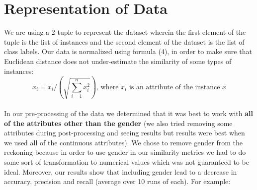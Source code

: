 \section{Representation of Data}

We are using a 2-tuple to represent the dataset wherein the first element of the tuple is the list of instances and the second element of the dataset is the list of class labels. Our data is normalized using formula (4), in order to make sure that Euclidean distance does not under-estimate the similarity of some types of instances:
\\
\begin{equation}
x_i = x_i/(\sqrt{\sum_{i=1}^{n} x_i^2}) \text{, where } x_i \text{ is an attribute of the instance } x
\end{equation}
\\
In our pre-processing of the data we determined that it was best to work with {\bf all of the attributes other than the gender} (we also tried removing some attributes during post-processing and seeing results but results were best when we used all of the continuous attributes). We chose to remove gender from the reckoning because in order to use gender in our similarity metrics we had to do some sort of transformation to numerical values which was not guaranteed to be ideal. Moreover, our results show that including gender lead to a decrease in accuracy, precision and recall (average over 10 runs of each). For example:

